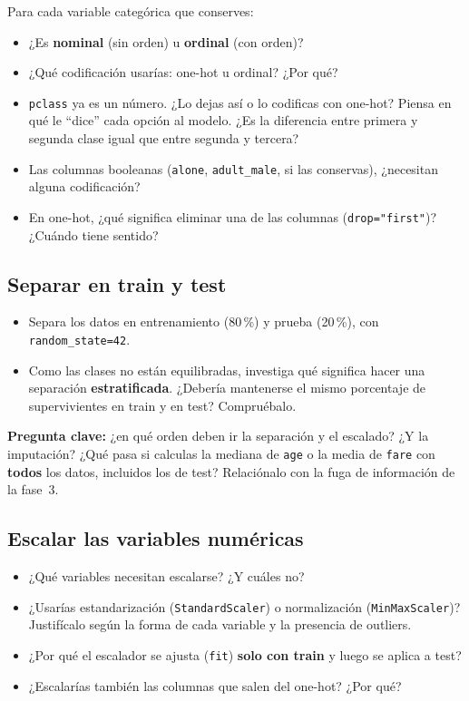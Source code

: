 \documentclass[11pt,a4paper]{article}
\newcommand{\col}[1]{\texttt{#1}}
\begin{document}
Para cada variable categórica que conserves:
\begin{itemize}
  \item ¿Es \textbf{nominal} (sin orden) u \textbf{ordinal} (con orden)?
  \item ¿Qué codificación usarías: one-hot u ordinal? ¿Por qué?
  \item \col{pclass} ya es un número. ¿Lo dejas así o lo codificas con one-hot? Piensa en
        qué le ``dice'' cada opción al modelo. ¿Es la diferencia entre primera y segunda
        clase igual que entre segunda y tercera?
  \item Las columnas booleanas (\col{alone}, \col{adult\_male}, si las conservas),
        ¿necesitan alguna codificación?
  \item En one-hot, ¿qué significa eliminar una de las columnas (\col{drop="first"})?
        ¿Cuándo tiene sentido?
\end{itemize}

\subsection{Separar en train y test}
\begin{itemize}
  \item Separa los datos en entrenamiento (80\,\%) y prueba (20\,\%), con \col{random\_state=42}.
  \item Como las clases no están equilibradas, investiga qué significa hacer una separación
        \textbf{estratificada}. ¿Debería mantenerse el mismo porcentaje de supervivientes
        en train y en test? Compruébalo.
\end{itemize}

\begin{aviso}
\textbf{Pregunta clave:} ¿en qué orden deben ir la separación y el escalado? ¿Y la
imputación? ¿Qué pasa si calculas la mediana de \col{age} o la media de \col{fare} con
\textbf{todos} los datos, incluidos los de test? Relaciónalo con la fuga de información
de la fase~3.
\end{aviso}

\subsection{Escalar las variables numéricas}
\begin{itemize}
  \item ¿Qué variables necesitan escalarse? ¿Y cuáles no?
  \item ¿Usarías estandarización (\col{StandardScaler}) o normalización
        (\col{MinMaxScaler})? Justifícalo según la forma de cada variable y la presencia
        de outliers.
  \item ¿Por qué el escalador se ajusta (\col{fit}) \textbf{solo con train} y luego se
        aplica a test?
  \item ¿Escalarías también las columnas que salen del one-hot? ¿Por qué?
\end{itemize}
\end{document}
